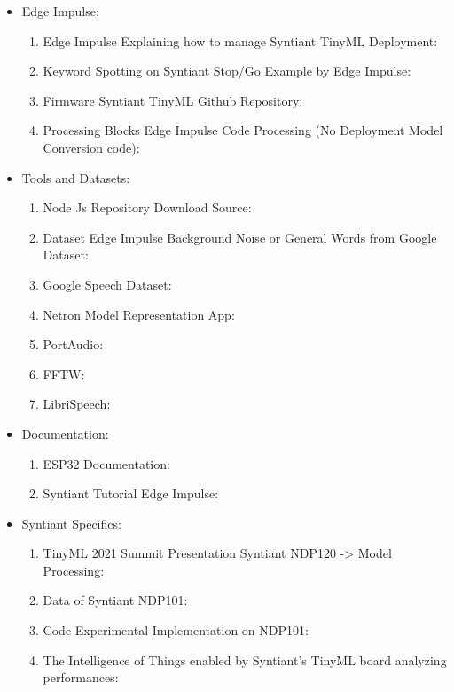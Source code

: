 \begin{itemize} 
\item Edge Impulse:
\begin{enumerate}
    \item Edge Impulse Explaining how to manage Syntiant TinyML Deployment: \cite{edgeimpulse_syntiant_tinyml}
    \item Keyword Spotting on Syntiant Stop/Go Example by Edge Impulse: \cite{edgeimpulse_kws_example}
    \item Firmware Syntiant TinyML Github Repository: \cite{edgeimpulse_firmware_syntiant}
    \item Processing Blocks Edge Impulse Code Processing (No Deployment Model Conversion code): \cite{edgeimpulse_processing_blocks}
\end{enumerate}
\item Tools and Datasets:
\begin{enumerate}
    \item Node Js Repository Download Source: \cite{nodejs_repository}
    \item Dataset Edge Impulse Background Noise or General Words from Google Dataset: \cite{edgeimpulse_dataset_499022}
    \item Google Speech Dataset: \cite{speechcommands}
    \item Netron Model Representation App: \cite{netron}
    \item PortAudio: \cite{portaudio}
    \item FFTW: \cite{FFTW}
    \item LibriSpeech: \cite{librispeech}
\end{enumerate}
\item Documentation:
\begin{enumerate}
    \item ESP32 Documentation: \cite{esp32documentation}
    \item Syntiant Tutorial Edge Impulse: \cite{syntiant_tutorial_edgeimpulse}
\end{enumerate}
\item Syntiant Specifics:
\begin{enumerate}
    \item TinyML 2021 Summit Presentation Syntiant NDP120 -> Model Processing: \cite{tinyML_2021_summit}
    \item Data of Syntiant NDP101: \cite{experimental_try_on_ndp101}
    \item Code Experimental Implementation on NDP101: \cite{origin_code_1}
    \item The Intelligence of Things enabled by Syntiant's TinyML board analyzing performances: \cite{analysis_syntiant_performances}

\end{enumerate}
\end{itemize}

